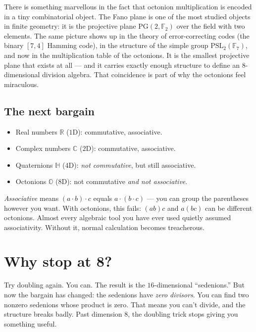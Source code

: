 \documentclass[11pt]{article}
\newcommand{\R}{\mathbb{R}}
\newcommand{\C}{\mathbb{C}}
\newcommand{\HH}{\mathbb{H}}
\newcommand{\OO}{\mathbb{O}}
\begin{document}
There is something marvellous in the fact that octonion
multiplication is encoded in a tiny combinatorial object. The Fano
plane is one of the most studied objects in finite geometry: it is
the projective plane $\mathrm{PG}(2, \mathbb{F}_2)$ over the field
with two elements. The same picture shows up in the
theory of error-correcting codes (the binary $[7,4]$ Hamming code),
in the structure of the simple group $\mathrm{PSL}_2(\mathbb{F}_7)$,
and now in the multiplication table of the octonions. It is the
smallest projective plane that exists at all --- and it carries
exactly enough structure to define an $8$-dimensional division
algebra. That coincidence is part of why the octonions feel
miraculous.

\subsection*{The next bargain}

\begin{itemize}[leftmargin=*, itemsep=2pt]
  \item Real numbers $\R$ ($1$D): commutative, associative.
  \item Complex numbers $\C$ ($2$D): commutative, associative.
  \item Quaternions $\HH$ ($4$D): \emph{not commutative}, but still
        associative.
  \item Octonions $\OO$ ($8$D): not commutative \emph{and not
        associative}.
\end{itemize}

\emph{Associative} means $(a \cdot b) \cdot c$ equals $a \cdot (b
\cdot c)$ --- you can group the parentheses however you want.
With octonions, this fails: $(a b) c$ and $a (b c)$ can be different
octonions. Almost every algebraic tool you have ever used quietly
assumed associativity. Without it, normal calculation becomes
treacherous.

\section*{Why stop at 8?}

Try doubling again. You can. The result is the $16$-dimensional
``sedenions.'' But now the bargain has changed: the sedenions have
\emph{zero divisors}. You can find two nonzero sedenions whose
product is zero. That means you can't divide, and the structure
breaks badly. Past dimension $8$, the doubling trick stops giving
you something useful.
\end{document}
